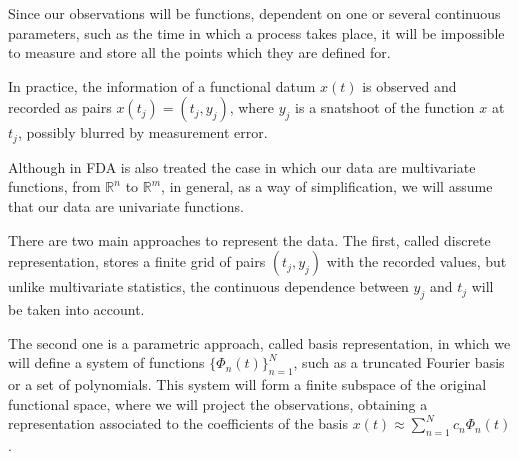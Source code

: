 Since our observations will be functions, dependent on one or several continuous
parameters, such as the time in which a process takes place, it will be
impossible to measure and store all the points which they are defined for.

In practice, the information of a functional datum $x(t)$ is observed and
recorded as pairs $x(t_j) = (t_j, y_j)$, where $y_j$ is a snatshoot of the
function $x$ at $t_j$, possibly blurred by measurement error\cite{Ramsay2005}.

Although in FDA is also treated the case in which our data are multivariate
functions, from  $\mathbb{R}^n$ to $\mathbb{R}^m$, in general, as a way of
simplification, we will assume that our data are univariate functions.

There are two main approaches to represent the data. The first, called discrete
representation, stores a finite grid of pairs $(t_j, y_j)$ with the recorded
values, but unlike multivariate statistics, the continuous dependence between
$y_j$ and $t_j$ will be taken into account.

The second one is a parametric approach, called basis representation, in which
we will define a system of functions $\{\Phi_n(t) \}_{n=1}^N$, such as a
truncated Fourier basis or a set of polynomials. This system will form a finite
subspace of the original functional space, where we will project the
observations, obtaining a representation associated to the coefficients of
the basis $x(t) \approx \sum_{n=1}^N c_n\Phi_n(t)$.
